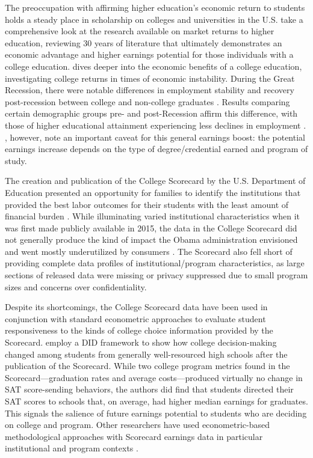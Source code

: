 \documentclass[a4paper, 12pt]{article}
\begin{document}
The preoccupation with affirming higher education's economic return to students holds a steady place in scholarship on colleges and universities in the U.S. \textcite{Oreopoulous_Petronijevic_2013} take a comprehensive look at the research available on market returns to higher education, reviewing 30 years of literature that ultimately demonstrates an economic advantage and higher earnings potential for those individuals with a college education. \textcite{hout_2012} dives deeper into the economic benefits of a college education, investigating college returns in times of economic instability. During the Great Recession, there were notable differences in employment stability and recovery post-recession between college and non-college graduates \parencite{hout_2012, hout_etal_2011ch}. Results comparing certain demographic groups pre- and post-Recession affirm this difference, with those of higher educational attainment experiencing less declines in employment \parencite{hoynesetal_2012}.  \textcite{Carnevale_etal_2011}, however, note an important caveat for this general earnings boost: the potential earnings increase depends on the type of degree/credential earned and program of study.

The creation and publication of the College Scorecard by the U.S. Department of Education presented an opportunity for families to identify the institutions that provided the best labor outcomes for their students with the least amount of financial burden \parencite{obama_2013}. While illuminating varied institutional characteristics when it was first made publicly available in 2015, the data in the College Scorecard did not generally produce the kind of impact the Obama administration envisioned and went mostly underutilized by consumers \parencite{huntington2016search}. The Scorecard also fell short of providing complete data profiles of institutional/program characteristics, as large sections of released data were missing or privacy suppressed due to small program sizes and concerns over confidentiality.

Despite its shortcomings, the College Scorecard data have been used in conjunction with standard econometric approaches to evaluate student responsiveness to the kinds of college choice information provided by the Scorecard. \textcite{hurwitz_student_2018} employ a DID framework to show how college decision-making changed among students from generally well-resourced high schools after the publication of the Scorecard. While two college program metrics found in the Scorecard---graduation rates and average costs---produced virtually no change in SAT score-sending behaviors, the authors did find that students directed their SAT scores to schools that, on average, had higher median earnings for graduates. This signals the salience of future earnings potential to students who are deciding on college and program. Other researchers have used econometric-based methodological approaches with Scorecard earnings data in particular institutional and program contexts \parencite{boland_effect_2021, elu_earnings_2019, mabel_value_2020, seaman_assessing_2017}.
\end{document}
